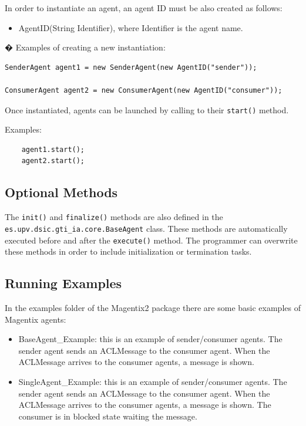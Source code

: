 In order to instantiate an agent, an agent ID must be also created as follows:
\begin{itemize}
 \item AgentID(String Identifier), where Identifier is the agent name.
\end{itemize}

�
Examples of creating a new instantiation:

\begin{lstlisting}
SenderAgent agent1 = new SenderAgent(new AgentID("sender"));

ConsumerAgent agent2 = new ConsumerAgent(new AgentID("consumer"));
\end{lstlisting}


Once instantiated, agents can be launched by calling to their \lstinline|start()| method.


Examples:

\begin{lstlisting}
    agent1.start();
    agent2.start();
\end{lstlisting}

\subsection{Optional Methods}
The \lstinline|init()| and \lstinline|finalize()| methods are also defined in the  \lstinline|es.upv.dsic.gti_ia.core.BaseAgent| class. These methods are automatically executed before and after the \lstinline|execute()| method. The programmer can  overwrite  these methods in order to include initialization or termination tasks.


\subsection{Running Examples}

In the examples folder of the Magentix2 package there are some basic examples of Magentix agents:
\begin{itemize}

 \item BaseAgent\_Example: this is an example of sender/consumer agents. The sender agent sends an ACLMessage to the consumer agent. When the ACLMessage arrives to the consumer agents, a message is shown.

 \item SingleAgent\_Example: this is an example of sender/consumer agents. The sender agent sends an ACLMessage to the consumer agent. When the ACLMessage arrives to the consumer agents, a message is shown.
The consumer is in blocked state waiting the message.

\end{itemize}

